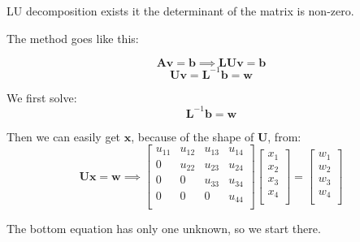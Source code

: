 LU decomposition exists it the determinant of the matrix is non-zero.

The method goes like this:

\[
\textbf{A}\textbf{v} = \textbf{b} \implies \textbf{L}\textbf{U}\textbf{v} = \textbf{b}
\]
\[
\textbf{U}\textbf{v} = \textbf{L}^{-1}\textbf{b} = \textbf{w}
\]

We first solve:
\[
\textbf{L}^{-1}\textbf{b} = \textbf{w}
\]

Then we can easily get $\textbf{x}$, because of the shape of $\textbf{U}$, from:
\[
\textbf{Ux}=\textbf{w} \implies 
\begin{bmatrix}
		u_{11}& u_{12}& u_{13} &u_{14} \\
        0 & u_{22} & u_{23} &u_{24}\\
        0& 0  &u_{33} & u_{34} \\
        0&0 & 0 & u_{44}\\
        \end{bmatrix}
\begin{bmatrix}
x_1\\
x_2\\
x_3\\
x_4\\
\end{bmatrix} =
\begin{bmatrix}
w_1\\
w_2\\
w_3\\
w_4\\
\end{bmatrix}        
\]

The bottom equation has only one unknown, so we start there.